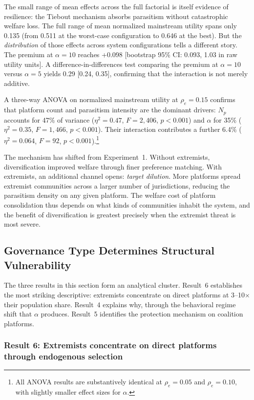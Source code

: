 \documentclass{article}
\begin{document}
The small range of mean effects across the full factorial is itself evidence of resilience: the Tiebout mechanism absorbs parasitism without catastrophic welfare loss. The full range of mean normalized mainstream utility spans only 0.135 (from 0.511 at the worst-case configuration to 0.646 at the best). But the \textit{distribution} of those effects across system configurations tells a different story. The premium at $\alpha = 10$ reaches +0.098 [bootstrap 95\% CI: 0.093, 1.03 in raw utility units]. A difference-in-differences test comparing the premium at $\alpha = 10$ versus $\alpha = 5$ yields 0.29 [0.24, 0.35], confirming that the interaction is not merely additive.

A three-way ANOVA on normalized mainstream utility at $\rho_e = 0.15$ confirms that platform count and parasitism intensity are the dominant drivers: $N_p$ accounts for 47\% of variance ($\eta^2 = 0.47$, $F = 2{,}406$, $p < 0.001$) and $\alpha$ for 35\% ($\eta^2 = 0.35$, $F = 1{,}466$, $p < 0.001$). Their interaction contributes a further 6.4\% ($\eta^2 = 0.064$, $F = 92$, $p < 0.001$).\footnote{All ANOVA results are substantively identical at $\rho_e = 0.05$ and $\rho_e = 0.10$, with slightly smaller effect sizes for $\alpha$.}

The mechanism has shifted from Experiment~1. Without extremists, diversification improved welfare through finer preference matching. With extremists, an additional channel opens: \textit{target dilution}. More platforms spread extremist communities across a larger number of jurisdictions, reducing the parasitism density on any given platform. The welfare cost of platform consolidation thus depends on what kinds of communities inhabit the system, and the benefit of diversification is greatest precisely when the extremist threat is most severe.

\subsection{Governance Type Determines Structural Vulnerability}
\label{sec:results_governance}

The three results in this section form an analytical cluster. Result~6 establishes the most striking descriptive: extremists concentrate on direct platforms at 3--10$\times$ their population share. Result~4 explains why, through the behavioral regime shift that $\alpha$ produces. Result~5 identifies the protection mechanism on coalition platforms.

\subsubsection{Result 6: Extremists concentrate on direct platforms through endogenous selection}
\end{document}
